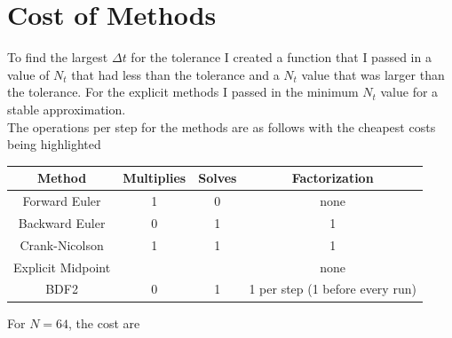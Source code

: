 \documentclass[12pt,answers]{exam}
\begin{document}
    \section{Cost of Methods}
    To find the largest $\Delta t$ for the tolerance I created a function that I passed in a value of $N_t$ that had less than the tolerance and a $N_t$ value that was larger than the tolerance. For the explicit methods I passed in the minimum $N_t$ value for a stable approximation. \\
    The operations per step for the methods are as follows with the cheapest costs being highlighted
    \begin{center}
        \begin{tabular}{|c|c|c|c|} \hline
            Method & Multiplies & Solves & Factorization \\ \hline
            Forward Euler & 1 & 0 & none \\ \hline
            Backward Euler & 0 & 1 & 1 \\ \hline
            Crank-Nicolson & 1 & 1 & 1 \\ \hline
            Explicit Midpoint & & & none \\ \hline
            BDF2 & 0 & 1 & 1 per step (1 before every run) \\ \hline
        \end{tabular}
    \end{center}
    For $N = 64$, the cost are 
\end{document}
